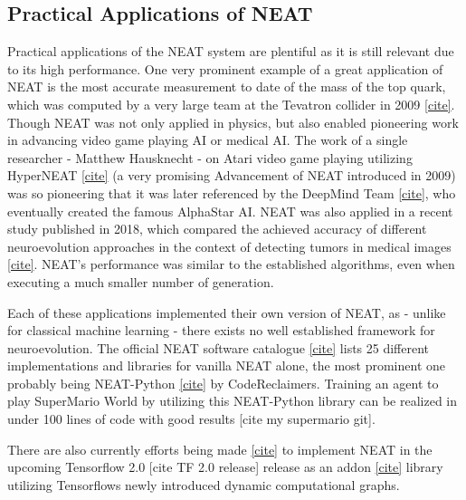 \documentclass[journal, a4paper]{IEEEtran}
\begin{document}

\subsection{Practical Applications of NEAT}

Practical applications of the NEAT system are plentiful as it is still relevant due to its high performance. One very prominent example of a great application of NEAT is the most accurate measurement to date of the mass of the top quark, which was computed by a very large team at the Tevatron collider in 2009 \href{https://www.ncbi.nlm.nih.gov/pubmed/19518620}{[cite]}. Though NEAT was not only applied in physics, but also enabled pioneering work in advancing video game playing AI or medical AI. 
The work of a single researcher - Matthew Hausknecht - on Atari video game playing utilizing HyperNEAT \href{https://www.cs.utexas.edu/~mhauskn/projects/atari/movies.html}{[cite]} (a very promising Advancement of NEAT introduced in 2009) was so pioneering that it was later referenced by the DeepMind Team \href{https://arxiv.org/pdf/1312.5602v1.pdf}{[cite]}, who eventually created the famous AlphaStar AI. NEAT was also applied in a recent study published in 2018, which compared the achieved accuracy of different neuroevolution approaches in the context of detecting tumors in medical images \href{http://www.bcc.ufrpe.br/sites/www.bcc.ufrpe.br/files/Luiz%20Fran%C3%A7a.pdf}{[cite]}. NEAT's performance was similar to the established algorithms, even when executing a much smaller number of generation.
    
Each of these applications implemented their own version of NEAT, as - unlike for classical machine learning - there exists no well established framework for neuroevolution. The official NEAT software catalogue \href{http://eplex.cs.ucf.edu/neat_software/}{[cite]} lists 25 different implementations and libraries for vanilla NEAT alone, the most prominent one probably being NEAT-Python \href{https://github.com/codereclaimers/neat-python}{[cite]} by CodeReclaimers. Training an agent to play SuperMario World by utilizing this NEAT-Python library can be realized in under 100 lines of code with good results [cite my supermario git].

There are also currently efforts being made \href{https://github.com/PaulPauls/Tensorflow-Neuroevolution}{[cite]} to implement NEAT in the upcoming Tensorflow 2.0 [cite TF 2.0 release] release as an addon \href{https://github.com/tensorflow/addons}{[cite]} library utilizing Tensorflows newly introduced dynamic computational graphs.
\end{document}
